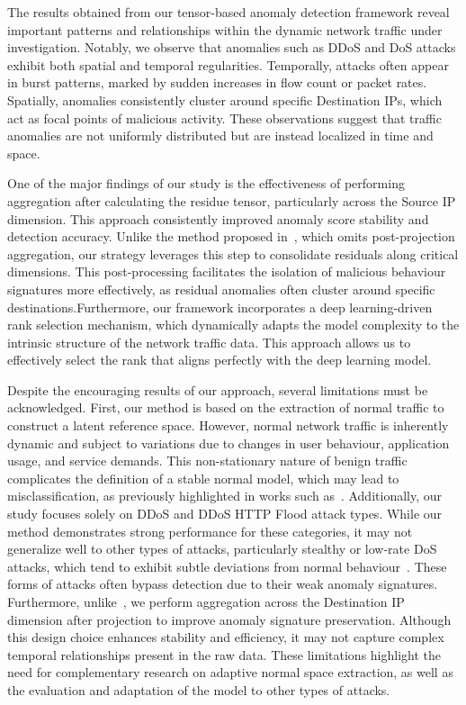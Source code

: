 \documentclass[pdflatex,sn-mathphys-num]{sn-jnl}
\theoremstyle{thmstyleone}
\theoremstyle{thmstyletwo}
\theoremstyle{thmstylethree}
\begin{document}
The results obtained from our tensor-based anomaly detection framework reveal important patterns and relationships within the dynamic network traffic under investigation. Notably, we observe that anomalies such as DDoS and DoS attacks exhibit both spatial and temporal regularities. Temporally, attacks often appear in burst patterns, marked by sudden increases in flow count or packet rates. Spatially, anomalies consistently cluster around specific Destination IPs, which act as focal points of malicious activity. These observations suggest that traffic anomalies are not uniformly distributed but are instead localized in time and space.

One of the major findings of our study is the effectiveness of performing aggregation after calculating the residue tensor, particularly across the Source IP dimension. This approach consistently improved anomaly score stability and detection accuracy. Unlike the method proposed in~\cite{streit2021network}, which omits post-projection aggregation, our strategy leverages this step to consolidate residuals along critical dimensions. This post-processing facilitates the isolation of malicious behaviour signatures more effectively, as residual anomalies often cluster around specific destinations.Furthermore, our framework incorporates a deep learning-driven rank selection mechanism, which dynamically adapts the model complexity to the intrinsic structure of the network traffic data. This approach allows us to effectively select the rank that aligns perfectly with the deep learning model.


Despite the encouraging results of our approach, several limitations must be acknowledged. First, our method is based on the extraction of normal traffic to construct a latent reference space. However, normal network traffic is inherently dynamic and subject to variations due to changes in user behaviour, application usage, and service demands. This non-stationary nature of benign traffic complicates the definition of a stable normal model, which may lead to misclassification, as previously highlighted in works such as~\cite{limitation2023generalization}. Additionally, our study focuses solely on DDoS and DDoS HTTP Flood attack types. While our method demonstrates strong performance for these categories, it may not generalize well to other types of attacks, particularly stealthy or low-rate DoS attacks, which tend to exhibit subtle deviations from normal behaviour~\cite{al2021machine}. These forms of attacks often bypass detection due to their weak anomaly signatures. Furthermore, unlike~\cite{streit2021network}, we perform aggregation across the Destination IP dimension after projection to improve anomaly signature preservation. Although this design choice enhances stability and efficiency, it may not capture complex temporal relationships present in the raw data. These limitations highlight the need for complementary research on adaptive normal space extraction, as well as the evaluation and adaptation of the model to other types of attacks.
\end{document}

